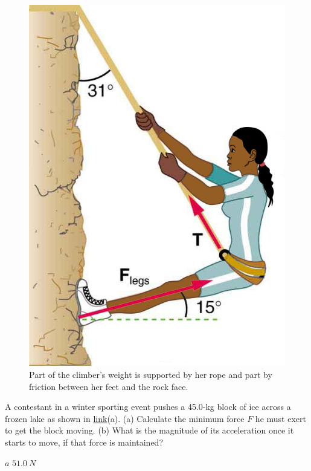 \documentclass[
]{book}
\newenvironment{problems-exercises}{}{}
\begin{document}
\begin{problems-exercises}
\begin{figure}
\hypertarget{fs-id1165296580243}{%
\centering
\includegraphics{images/Figure_06_01_06.jpg}
\caption{Part of the climber's weight is supported by her rope and part by
friction between her feet and the rock
face.}\label{fs-id1165296580243}
}
\end{figure}

\hypertarget{fs-id1531145}{}
\leavevmode\hypertarget{fs-id1531146}{}%
A contestant in a winter sporting event pushes a 45.0-kg block of ice
across a frozen lake as shown in
\protect\hyperlink{import-auto-id1165298619770}{link}(a). (a)
Calculate the minimum force \(F\) he must exert to get the block moving.
(b) What is the magnitude of its acceleration once it starts to move, if
that force is maintained?

\leavevmode\hypertarget{fs-id1465087}{}%
\(a\) \({\text{51}\text{.}0\ N}{}\)


\end{problems-exercises}
\end{document}
